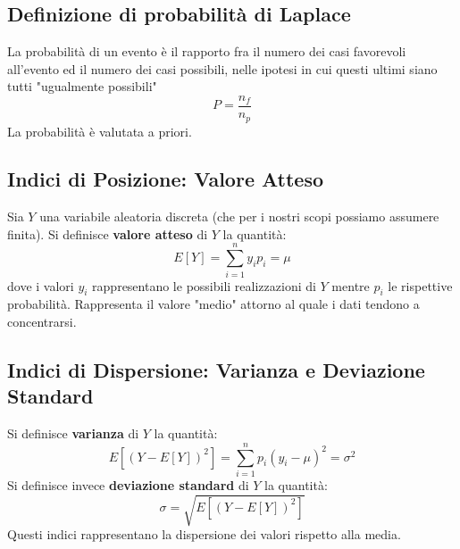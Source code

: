 \subsection{Definizione di probabilità di Laplace}
La probabilità di un evento è il rapporto fra il numero dei casi favorevoli all'evento ed il numero dei casi possibili, nelle ipotesi in cui questi ultimi siano tutti "ugualmente possibili"
\begin{equation}
	P=\frac{n_f}{n_p}
\end{equation}
La probabilità è valutata a priori.


\subsection{Indici di Posizione: Valore Atteso}
Sia $Y$ una variabile aleatoria discreta (che per i nostri scopi possiamo assumere finita). Si definisce \textbf{valore atteso} di $Y$ la quantità:
\begin{equation}
    E[Y] = \sum_{i=1}^{n} y_i p_i = \mu
\end{equation}
dove i valori $y_i$ rappresentano le possibili realizzazioni di $Y$ mentre $p_i$ le rispettive probabilità. Rappresenta il valore "medio" attorno al quale i dati tendono a concentrarsi.
\subsection{Indici di Dispersione: Varianza e Deviazione Standard}
Si definisce \textbf{varianza} di $Y$ la quantità:
\begin{equation}
    E[(Y-E[Y])^2]= \sum_{i=1}^{n}p_i(y_i - \mu)^2 = \sigma^2
\end{equation}
Si definisce invece \textbf{deviazione standard} di $Y$ la quantità:
\begin{equation}
    \sigma = \sqrt{E[(Y-E[Y])^2]}
\end{equation}
Questi indici rappresentano la dispersione dei valori rispetto alla media.

